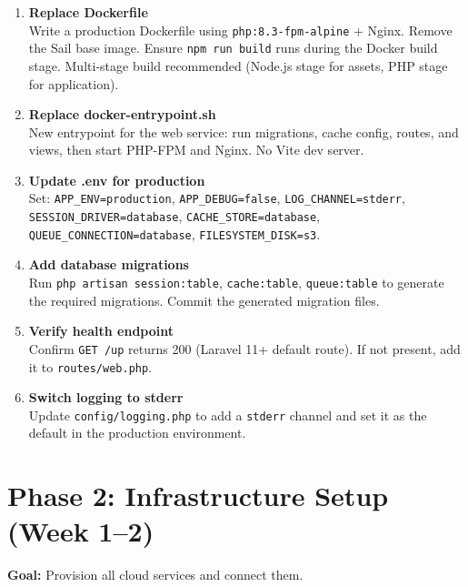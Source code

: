 \documentclass[12pt,a4paper]{report}
\begin{document}
\begin{enumerate}[leftmargin=1.5em, label=\textbf{\arabic*.}]

    \item \textbf{Replace Dockerfile} \\
    Write a production Dockerfile using \texttt{php:8.3-fpm-alpine} +
    Nginx. Remove the Sail base image. Ensure \texttt{npm run build}
    runs during the Docker build stage. Multi-stage build recommended
    (Node.js stage for assets, PHP stage for application).

    \item \textbf{Replace docker-entrypoint.sh} \\
    New entrypoint for the web service: run migrations, cache config,
    routes, and views, then start PHP-FPM and Nginx. No Vite dev server.

    \item \textbf{Update .env for production} \\
    Set: \texttt{APP\_ENV=production}, \texttt{APP\_DEBUG=false},
    \texttt{LOG\_CHANNEL=stderr}, \texttt{SESSION\_DRIVER=database},
    \texttt{CACHE\_STORE=database}, \texttt{QUEUE\_CONNECTION=database},
    \texttt{FILESYSTEM\_DISK=s3}.

    \item \textbf{Add database migrations} \\
    Run \texttt{php artisan session:table}, \texttt{cache:table},
    \texttt{queue:table} to generate the required migrations.
    Commit the generated migration files.

    \item \textbf{Verify health endpoint} \\
    Confirm \texttt{GET /up} returns 200 (Laravel 11+ default route).
    If not present, add it to \texttt{routes/web.php}.

    \item \textbf{Switch logging to stderr} \\
    Update \texttt{config/logging.php} to add a \texttt{stderr}
    channel and set it as the default in the production environment.

\end{enumerate}

\section{Phase 2: Infrastructure Setup (Week 1--2)}

\textbf{Goal:} Provision all cloud services and connect them.
\end{document}
